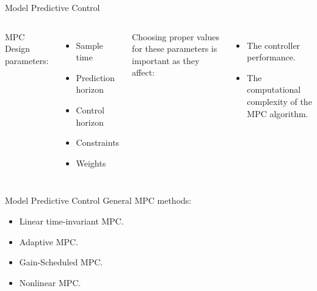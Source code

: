 \documentclass{thesisbeamer}
\begin{document}
\begin{frame}{Model Predictive Control} \vspace{4pt}

\begin{columns}
MPC Design parameters:

\begin{itemize}[<+->]
	\item Sample time
	\item Prediction horizon
	\item Control horizon
	\item Constraints
	\item Weights
\end{itemize}\pause


Choosing proper values for these parameters is important as they affect: 
\begin{itemize}
	\item The controller performance.
	\item The computational complexity of the MPC algorithm.
\end{itemize} 
\end{columns}

\end{frame}

\begin{frame}[t]{Model Predictive Control} \vspace{4pt}
General MPC methods:

\begin{itemize}[<+->]
	\item Linear time-invariant MPC.
	\item Adaptive MPC.
	\item Gain-Scheduled MPC.
	\item Nonlinear MPC.
\end{itemize}

\end{frame}
\end{document}
